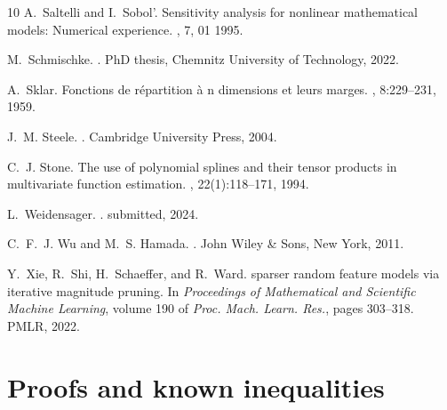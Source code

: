 \documentclass{article}
\renewcommand{\d}{\, \mathrm{d}}
\theoremstyle{definition}
\numberwithin{equation}{section}
\begin{document}
\begin{thebibliography}{10}
A.~Saltelli and I.~Sobol’.
\newblock Sensitivity analysis for nonlinear mathematical models: Numerical
  experience.
, 7, 01 1995.

M.~Schmischke.
.
\newblock PhD thesis, Chemnitz University of Technology, 2022.

A.~Sklar.
\newblock Fonctions de r\'epartition \`a n dimensions et leurs marges.
, 8:229--231, 1959.

J.~M. Steele.
.
\newblock Cambridge University Press, 2004.

C.~J. Stone.
\newblock The use of polynomial splines and their tensor products in
  multivariate function estimation.
, 22(1):118--171, 1994.

L.~Weidensager.
.
\newblock submitted, 2024.

C.~F.~J. Wu and M.~S. Hamada.
.
\newblock John Wiley \& Sons, New York, 2011.

Y.~Xie, R.~Shi, H.~Schaeffer, and R.~Ward.
 sparser random feature models via iterative magnitude
  pruning.
\newblock  In {\em Proceedings of Mathematical and Scientific Machine Learning}, volume 190 of
  {\em  Proc. Mach. Learn. Res.}, pages 303--318. PMLR, 2022.
	
	

\end{thebibliography}
\renewcommand{\d}{\, \mathrm{d}}   %
\appendix
\section{Proofs and known inequalities}
\end{document}
